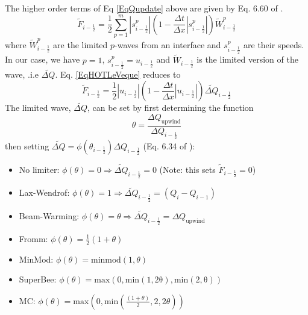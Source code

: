 The higher order terms of Eq \ref{EqQupdate} above are given by Eq. 6.60 of \cite{LeVeque03}.
\begin{equation}\label{EqHOTLeVeque}
\widetilde{F}_{i-\frac{1}{2}} = \frac{1}{2}\sum_{p=1}^{m} \left| s^p_{i-\frac{1}{2}}  \right|
\left( 1 - \frac{\Delta t}{\Delta x} \left| s^p_{i-\frac{1}{2}}  \right|  \right)
\widetilde{W}^p_{i-\frac{1}{2}}
\end{equation}
where $\widetilde{W}^p_{i-\frac{1}{2}}$ are the limited $p$-waves from an interface
and $s^p_{i-\frac{1}{2}}$ are their speeds.  In our case, we have $p=1$, 
$s^p_{i-\frac{1}{2}}=u_{i-\frac{1}{2}}$ and $\widetilde{W}_{i-\frac{1}{2}}$ is the limited version of
the wave, .i.e $\widetilde{\Delta Q}$.
Eq. \ref{EqHOTLeVeque} reduces to
\begin{equation}\label{EqHOTAsh3d}
\widetilde{F}_{i-\frac{1}{2}} = \frac{1}{2} \left| u_{i-\frac{1}{2}}  \right|
\left( 1 - \frac{\Delta t}{\Delta x} \left| u_{i-\frac{1}{2}}  \right|  \right)
\widetilde{\Delta Q}_{i-\frac{1}{2}}
\end{equation}
The limited wave, $\widetilde{\Delta Q}$, can be set by first determining the
function
\begin{equation}
\theta = \frac{\Delta Q_{\mathrm{upwind}}}{\Delta Q_{i-\frac{1}{2}}}
\end{equation}
then setting
$\widetilde{\Delta Q} = \phi\left( \theta_{i-\frac{1}{2}} \right) \Delta Q_{i-\frac{1}{2}}$
(Eq. 6.34 of \cite{LeVeque03}):
\begin{itemize}
 \item No limiter: $\phi\left( \theta \right) = 0  \Rightarrow \widetilde{\Delta Q}_{i-\frac{1}{2}} = 0$
       (Note: this sets $\widetilde{F}_{i-\frac{1}{2}} = 0$)
 \item Lax-Wendrof: $\phi\left( \theta \right) = 1 \Rightarrow \widetilde{\Delta Q}_{i-\frac{1}{2}} = ( Q_i - Q_{i-1})$
 \item Beam-Warming:  $\phi\left( \theta \right) = \theta \Rightarrow \widetilde{\Delta Q}_{i-\frac{1}{2}} = \Delta Q_{\mathrm{upwind}}$
 \item Fromm: $\phi\left( \theta \right) = \frac{1}{2}\left( 1 + \theta\right) $
 \item MinMod: $\phi\left( \theta \right) = \mathrm{minmod}\left( 1,\theta \right)$
 \item SuperBee: $\phi\left( \theta \right) = \mathrm{max}\left(0, \mathrm{min \left( 1,2\theta\right),\mathrm{min}\left(2,\theta \right)} \right )$
 \item MC: $\phi\left( \theta \right) = \mathrm{max}\left(0,  \mathrm{min} \left( \frac{\left( 1+\theta \right)}{2} ,2,2\theta \right) \right) $
\end{itemize}

